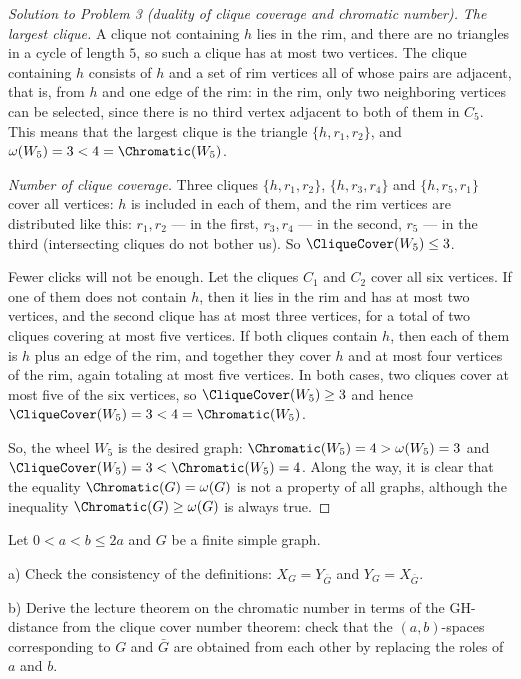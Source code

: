 \documentclass[a4paper,12pt]{report}
\begin{document}
\begin{proof}[Solution to Problem \textup{3} \textup{(}duality of clique coverage and chromatic number\textup{)}]
\textit{The largest clique.} A clique not containing $h$ lies in the rim, and there are no triangles in a cycle of length $5$, so such a clique has at most two vertices. The clique containing $h$ consists of $h$ and a set of rim vertices all of whose pairs are adjacent, that is, from $h$ and one edge of the rim\textup{:} in the rim, only two neighboring vertices can be selected, since there is no third vertex adjacent to both of them in $C_5$. This means that the largest clique is the triangle $\{h,r_1,r_2\}$, and $\omega(W_5)=3<4=\Chromatic(W_5)$.

\textit{Number of clique coverage.} Three cliques $\{h,r_1,r_2\}$, $\{h,r_3,r_4\}$ and $\{h,r_5,r_1\}$ cover all vertices\textup{:} $h$ is included in each of them, and the rim vertices are distributed like this\textup{:} $r_1,r_2$ --- in the first, $r_3,r_4$ --- in the second, $r_5$ --- in the third (intersecting cliques do not bother us). So $\CliqueCover(W_5)\le3$.

Fewer clicks will not be enough. Let the cliques $C_1$ and $C_2$ cover all six vertices. If one of them does not contain $h$, then it lies in the rim and has at most two vertices, and the second clique has at most three vertices, for a total of two cliques covering at most five vertices. If both cliques contain $h$, then each of them is $h$ plus an edge of the rim, and together they cover $h$ and at most four vertices of the rim, again totaling at most five vertices. In both cases, two cliques cover at most five of the six vertices, so $\CliqueCover(W_5)\ge3$ and hence $\CliqueCover(W_5)=3<4=\Chromatic(W_5)$.

So, the wheel $W_5$ is the desired graph\textup{:} $\Chromatic(W_5)=4>\omega(W_5)=3$ and $\CliqueCover(W_5)=3<\Chromatic(W_5)=4$. Along the way, it is clear that the equality $\Chromatic(G)=\omega(G)$ is not a property of all graphs, although the inequality $\Chromatic(G)\ge\omega(G)$ is always true.
\end{proof}

\begin{task}
Let $0<a<b\le2a$ and $G$ be a finite simple graph.

\textup{a)} Check the consistency of the definitions\textup{:} $X_G=Y_{\bar G}$ and $Y_G=X_{\bar G}$.

\textup{b)} Derive the lecture theorem on the chromatic number in terms of the GH-distance from the clique cover number theorem\textup{:} check that the $(a,b)$-spaces corresponding to $G$ and $\bar G$ are obtained from each other by replacing the roles of $a$ and $b$.

\end{task}
\end{document}
